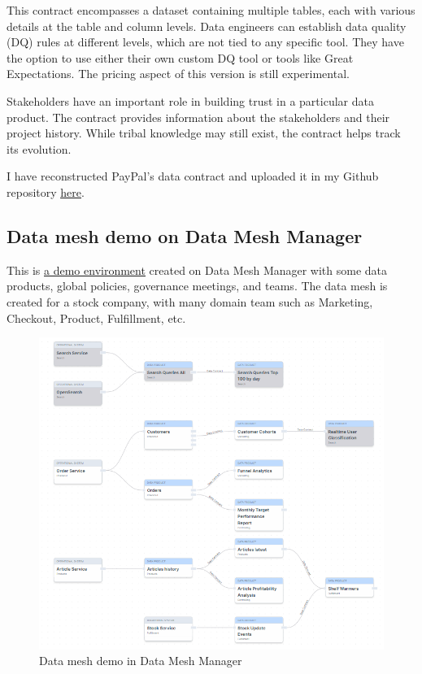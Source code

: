 \documentclass[12pt, a4paper]{book}
\begin{document}
This contract encompasses a dataset containing multiple tables, each with various details at the table and column levels. Data engineers can establish data quality (DQ) rules at different levels, which are not tied to any specific tool. They have the option to use either their own custom DQ tool or tools like Great Expectations. The pricing aspect of this version is still experimental.

Stakeholders have an important role in building trust in a particular data product. The contract provides information about the stakeholders and their project history. While tribal knowledge may still exist, the contract helps track its evolution.

I have reconstructed PayPal's data contract and uploaded it in my Github repository \href{https://github.com/ngocminhta/DataMeshReport/tree/main/DataContractPayPal.md}{\underline{here}}.

\subsection{Data mesh demo on Data Mesh Manager}
This is \href{https://demo.datamesh-manager.com/}{\underline{a demo environment}} created on Data Mesh Manager with some data products, global policies, governance meetings, and teams. The data mesh is created for a stock company, with many domain team such as Marketing, Checkout, Product, Fulfillment, etc.

\begin{figure}[h]
	\begin{framed}
		\centering
		\includegraphics[width=15cm]{DataMeshManagerDemo.png}
		\caption{Data mesh demo in Data Mesh Manager}
		\label{DataMeshManagerDemo}
	\end{framed}
\end{figure}
\end{document}
